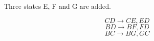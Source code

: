 \documentclass[12pt, a4paper]{article}
\begin{document}
	Three states E, F and G are added.
	\begin{center}
	\end{center}
	$$CD \rightarrow CE, ED$$
	$$BD \rightarrow BF, FD$$
	$$BC \rightarrow BG, GC$$
	
\end{document}

